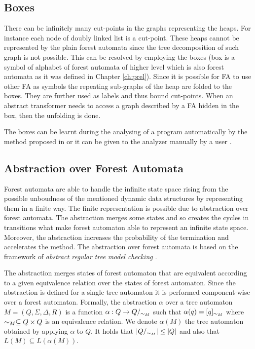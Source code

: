 \subsection{Boxes}
\label{subsec:boxes}

There can be infinitely many cut-points in the graphs representing the heaps.
For instance each node of doubly linked list is a cut-point.
These heaps cannot be represented by the plain forest automata
since the tree decomposition of such graph is not possible.
This can be resolved by employing the boxes (box is a symbol of alphabet of forest automata
of higher level which is also forest automata as it was defined in Chapter \ref{ch:prel}).
Since it is possible for FA to use other FA as symbols
the repeating sub-graphs of the heap are folded to the boxes.
They are further used as labels and thus bound cut-points.
When an abstract transformer needs to access a graph described by a FA hidden in the box, then the unfolding is done.

The boxes can be learnt during the analysing of a program automatically by the method proposed in \cite{forester13} or
it can be given to the analyzer manually by a user \cite{forester11}.

\subsection{Abstraction over Forest Automata}
\label{subsec:abstraction}

Forest automata are able to handle the infinite state space
rising from the possible unboudness of the mentioned dynamic data structures
by representing them in a finite way.
The finite representation is possible due to abstraction over forest automata.
The abstraction merges some states and so creates the cycles
in transitions what make forest automaton able to represent an infinite state space.
Moreover, the abstraction increases the probability of the termination and accelerates the method.
The abstraction over forest automata is based on the framework of \emph{abstract regular tree model checking} \cite{artmc}.

The abstraction merges states of forest automaton that are equivalent
according to a given equivalence relation over the states of forest automaton.
Since the abstraction is defined for a single tree automaton
it is performed component-wise over a forest automaton.
Formally, the abstraction $\alpha$ over a tree automaton $M=(Q, \Sigma, \Delta, R)$ is
a function $\alpha: Q \rightarrow Q/_{\sim_M}$ such that $\alpha(q) = [q]_{\sim_M}$
where $\sim_M \subseteq Q \times Q$ is an equivalence relation.
We denote $\alpha(M)$ the tree automaton obtained by applying $\alpha$ to $Q$.
It holds that $|Q/_{\sim_M}| \leq |Q|$ and also that $L(M) \subseteq L(\alpha(M))$.

